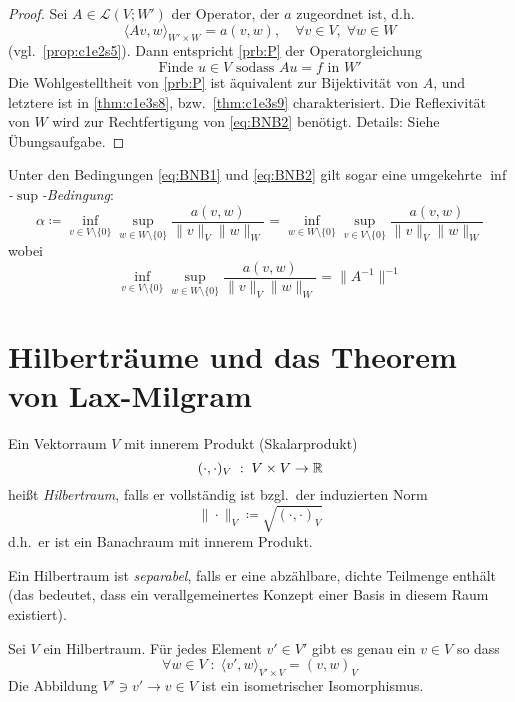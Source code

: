 \documentclass[../skript.tex]{subfiles}
\begin{document}
\begin{proof}
	Sei $A\in\mathcal{L}(V;W')$ der Operator, der $a$ zugeordnet ist, d.h.
	\[
		\langle Av, w \rangle_{W'\times W} = a(v,w),\quad\forall v\in V, \; \forall w\in W
	\]
	(vgl.\ \cref{prop:c1e2s5}). Dann entspricht \cref{prb:P} der Operatorgleichung
	\[
		\text{Finde }u\in V\text{ sodass } Au = f\text{ in } W'
	\]
	Die Wohlgestelltheit von \cref{prb:P} ist äquivalent zur Bijektivität von $A$, und letztere ist in \cref{thm:c1e3s8}, bzw.\ \cref{thm:c1e3s9} charakterisiert. Die Reflexivität von $W$ wird zur Rechtfertigung von \cref{eq:BNB2} benötigt. Details: Siehe Übungsaufgabe.
\end{proof}

\begin{remark} %
\label{bem:c1e4s3}
	Unter den Bedingungen \cref{eq:BNB1} und \cref{eq:BNB2} gilt sogar eine umgekehrte \emph{$\inf$-$\sup$-Bedingung}:
	\[
		\alpha \coloneqq \inf_{v\in V\setminus\{0\}}\sup_{w\in W\setminus\{0\}}\frac{a(v,w)}{\| v \|_V \| w \|_W} = \inf_{w\in W\setminus\{0\}}\sup_{v\in V\setminus\{0\}}\frac{a(v,w)}{\| v \|_V \| w \|_W}
	\]
	wobei 
	\[
		\inf_{v\in V\setminus\{0\}}\sup_{w\in W\setminus\{0\}}\frac{a(v,w)}{\| v \|_V \| w \|_W} = \| A^{-1} \| ^{-1}
	\]
\end{remark}
\section{Hilberträume und das Theorem von Lax-Milgram}

\begin{definition} %
\label{def:c1e5s1}
	Ein Vektorraum $V$ mit innerem Produkt (Skalarprodukt) 
	\[
		(\cdot,\cdot)_V \; : \; V\times V\to \mathbb{R}
	\]
	heißt \emph{Hilbertraum}, falls er vollständig ist bzgl.\ der induzierten Norm
	\[
		\| \cdot \|_V \coloneqq \sqrt{(\cdot,\cdot)_V}
	\]
	d.h.\ er ist ein Banachraum mit innerem Produkt.

	Ein Hilbertraum ist \emph{separabel}, falls er eine abzählbare, dichte Teilmenge enthält (das bedeutet, dass ein verallgemeinertes Konzept einer Basis in diesem Raum existiert).
\end{definition}

\begin{theorem} %
\label{thm:c1e5s2}
	Sei $V$ ein Hilbertraum. Für jedes Element $v'\in V'$ gibt es genau ein $v\in V$ so dass 
	\[
		\forall w\in V \; :\;\langle v', w \rangle_{V'\times V} = \left(v,w\right)_V
	\]
	Die Abbildung $V'\ni v'\to v\in V$ ist ein isometrischer Isomorphismus. 
\end{theorem}
\end{document}
